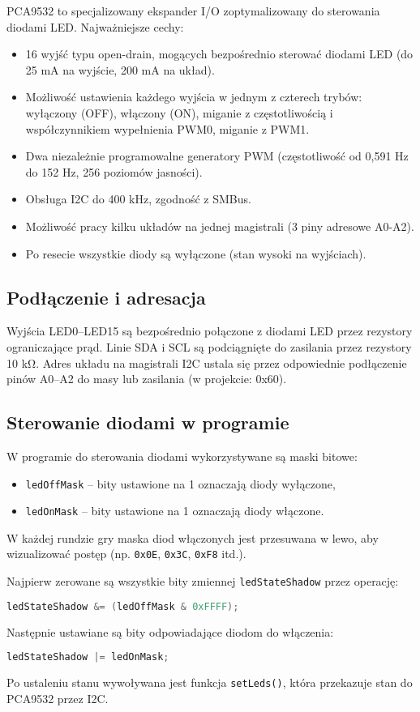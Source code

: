 \documentclass[a4paper,12pt]{report}
\begin{document}
PCA9532 to specjalizowany ekspander I/O zoptymalizowany do sterowania diodami LED. Najważniejsze cechy:
\begin{itemize}
    \item 16 wyjść typu open-drain, mogących bezpośrednio sterować diodami LED (do 25 mA na wyjście, 200 mA na układ).
    \item Możliwość ustawienia każdego wyjścia w jednym z czterech trybów: wyłączony (OFF), włączony (ON), miganie z częstotliwością i współczynnikiem wypełnienia PWM0, miganie z PWM1.
    \item Dwa niezależnie programowalne generatory PWM (częstotliwość od 0,591 Hz do 152 Hz, 256 poziomów jasności).
    \item Obsługa I2C do 400 kHz, zgodność z SMBus.
    \item Możliwość pracy kilku układów na jednej magistrali (3 piny adresowe A0-A2).
    \item Po resecie wszystkie diody są wyłączone (stan wysoki na wyjściach).
\end{itemize}

\subsection*{Podłączenie i adresacja}

Wyjścia LED0–LED15 są bezpośrednio połączone z diodami LED przez rezystory ograniczające prąd. Linie SDA i SCL są podciągnięte do zasilania przez rezystory 10 k\si{\ohm}. Adres układu na magistrali I2C ustala się przez odpowiednie podłączenie pinów A0–A2 do masy lub zasilania (w projekcie: 0x60).

\subsection*{Sterowanie diodami w programie}

W programie do sterowania diodami wykorzystywane są maski bitowe:
\begin{itemize}
    \item \texttt{ledOffMask} – bity ustawione na 1 oznaczają diody wyłączone,
    \item \texttt{ledOnMask} – bity ustawione na 1 oznaczają diody włączone.
\end{itemize}
W każdej rundzie gry maska diod włączonych jest przesuwana w lewo, aby wizualizować postęp (np. \texttt{0x0E}, \texttt{0x3C}, \texttt{0xF8} itd.).

Najpierw zerowane są wszystkie bity zmiennej \texttt{ledStateShadow} przez operację:
\begin{lstlisting}[language=C]
ledStateShadow &= (ledOffMask & 0xFFFF);
\end{lstlisting}
Następnie ustawiane są bity odpowiadające diodom do włączenia:
\begin{lstlisting}[language=C]
ledStateShadow |= ledOnMask;
\end{lstlisting}
Po ustaleniu stanu wywoływana jest funkcja \texttt{setLeds()}, która przekazuje stan do PCA9532 przez I2C.
\end{document}
